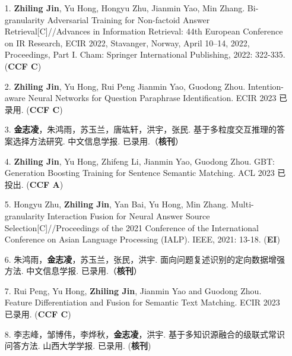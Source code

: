\begin{enumerate}[itemsep=0.7em, leftmargin=2em, itemindent=0em,labelwidth=2em]
	\item[1.] \textbf{Zhiling Jin}, Yu Hong, Hongyu Zhu, Jianmin Yao, Min Zhang. Bi-granularity Adversarial Training for Non-factoid Answer Retrieval[C]//Advances in Information Retrieval: 44th European Conference on IR Research, ECIR 2022, Stavanger, Norway, April 10–14, 2022, Proceedings, Part I. Cham: Springer International Publishing, 2022: 322-335. (\textbf{CCF C})
	\item[2.] \textbf{Zhiling Jin}, Yu Hong, Rui Peng Jianmin Yao, Guodong Zhou. Intention-aware Neural Networks for Question Paraphrase Identification. ECIR 2023 已录用. (\textbf{CCF C})
	\item[3.] \textbf{金志凌}，朱鸿雨，苏玉兰，唐竑轩，洪宇，张民. 基于多粒度交互推理的答案选择方法研究. 中文信息学报. 已录用.（\textbf{核刊}）
	\item[4.] \textbf{Zhiling Jin}, Yu Hong, Zhifeng Li, Jianmin Yao, Guodong Zhou. GBT: Generation Boosting Training for Sentence Semantic Matching. ACL 2023 已投出. (\textbf{CCF A})
	\item[5.] Hongyu Zhu, \textbf{Zhiling Jin}, Yan Bai, Yu Hong, Min Zhang. Multi-granularity Interaction Fusion for Neural Answer Source Selection[C]//Proceedings of the 2021 Conference of the International Conference on Asian Language Processing (IALP). IEEE, 2021: 13-18. (\textbf{EI})
	\item[6.] 朱鸿雨，\textbf{金志凌}，苏玉兰，张民，洪宇. 面向问题复述识别的定向数据增强方法. 中文信息学报. 已录用.（\textbf{核刊}）
	\item[7.] Rui Peng, Yu Hong, \textbf{Zhiling Jin}, Jianmin Yao and Guodong Zhou. Feature Differentiation and Fusion for Semantic Text Matching. ECIR 2023 已录用. (\textbf{CCF C})
	\item[8.] 李志峰，邹博伟，李烨秋，\textbf{金志凌}，洪宇. 基于多知识源融合的级联式常识问答方法. 山西大学学报. 已录用. (\textbf{核刊})
\end{enumerate}
